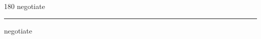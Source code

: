 
\begin{frame}
\begin{center}
\begin{turn}{180}
{\fontsize{2.5cm}{1em}\selectfont negotiate}
\end{turn}
\vspace{1em}\par  
\hrule
\vspace{1em}\par  
{\fontsize{2.5cm}{1em}\selectfont negotiate}
\end{center}
\end{frame}
